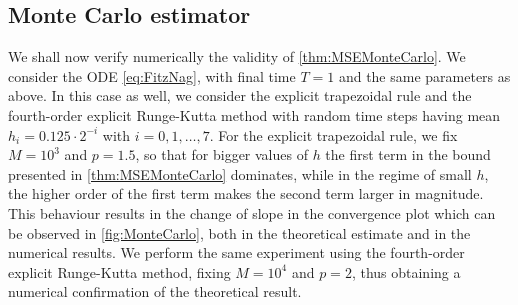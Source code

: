 \documentclass[final,onefignum,onetabnum]{siamonline171218}
\begin{document}
\subsection{Monte Carlo estimator} 
We shall now verify numerically the validity of \cref{thm:MSEMonteCarlo}. We consider the ODE \eqref{eq:FitzNag}, with final time $T = 1$ and the same parameters as above. In this case as well, we consider the explicit trapezoidal rule and the fourth-order explicit Runge-Kutta method with random time steps having mean $h_i = 0.125\cdot 2^{-i}$ with $i = 0, 1, \ldots, 7$. For the explicit trapezoidal rule, we fix $M = 10^3$ and $p = 1.5$, so that for bigger values of $h$ the first term in the bound presented in \cref{thm:MSEMonteCarlo} dominates, while in the regime of small $h$, the higher order of the first term makes the second term larger in magnitude. This behaviour results in the change of slope in the convergence plot which can be observed in \cref{fig:MonteCarlo}, both in the theoretical estimate and in the numerical results. We perform the same experiment using the fourth-order explicit Runge-Kutta method, fixing $M = 10^4$ and $p = 2$, thus obtaining a numerical confirmation of the theoretical result.
\end{document}
